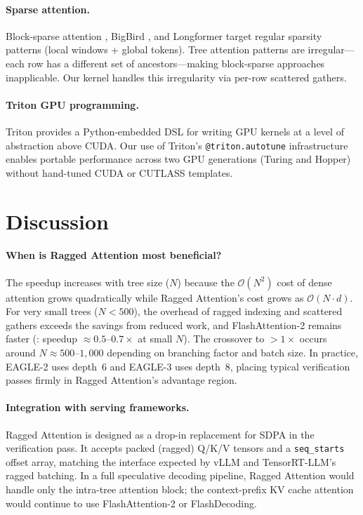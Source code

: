 \documentclass{article}
\newcommand{\method}{Ragged Attention}
\newcommand{\bigO}[1]{\mathcal{O}(#1)}
\newcommand{\numtokens}{N}
\newcommand{\depth}{d}
\begin{document}
\paragraph{Sparse attention.}
Block-sparse attention \cite{child2019generating},
BigBird \cite{zaheer2020bigbird}, and Longformer \cite{beltagy2020longformer}
target regular sparsity patterns (local windows + global tokens).
Tree attention patterns are irregular—each row has a different set
of ancestors—making block-sparse approaches inapplicable.
Our kernel handles this irregularity via per-row scattered gathers.

\paragraph{Triton GPU programming.}
Triton \cite{tillet2019triton} provides a Python-embedded DSL for
writing GPU kernels at a level of abstraction above CUDA.
Our use of Triton's \texttt{@triton.autotune} infrastructure enables
portable performance across two GPU generations (Turing and Hopper)
without hand-tuned CUDA or CUTLASS templates.

\section{Discussion}\label{sec:discussion}

\paragraph{When is \method{} most beneficial?}
The speedup increases with tree size ($\numtokens$) because the
$\bigO{N^2}$ cost of dense attention grows quadratically while
\method{}'s cost grows as $\bigO{N \cdot \depth}$.
For very small trees ($\numtokens < 500$), the overhead of ragged
indexing and scattered gathers exceeds the savings from reduced work,
and FlashAttention-2 remains faster
(: speedup $\approx 0.5\text{--}0.7\times$ at small $N$).
The crossover to $>1\times$ occurs around $\numtokens \approx 500\text{--}1{,}000$
depending on branching factor and batch size.
In practice, EAGLE-2 uses depth~6 and EAGLE-3 uses depth~8, placing
typical verification passes firmly in \method{}'s advantage region.

\paragraph{Integration with serving frameworks.}
\method{} is designed as a drop-in replacement for SDPA in the
verification pass.  It accepts packed (ragged) Q/K/V tensors and
a \texttt{seq\_starts} offset array, matching the interface expected
by vLLM \cite{kwon2023vllm} and TensorRT-LLM's ragged batching.
In a full speculative decoding pipeline, \method{} would handle
only the intra-tree attention block; the context-prefix KV cache
attention would continue to use FlashAttention-2 or FlashDecoding.
\end{document}
